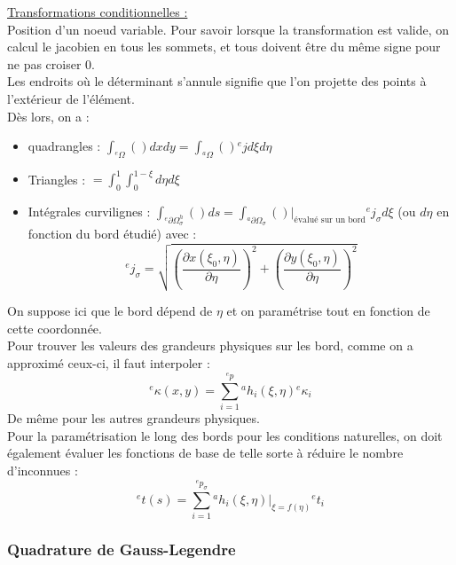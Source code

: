 \documentclass[../main.tex]{subfiles}
\begin{document}
\quad \underline{Transformations conditionnelles :}\\
Position d'un noeud variable. Pour savoir lorsque la transformation est valide, on calcul le jacobien en tous les sommets, et tous doivent être du même signe pour ne pas croiser 0.\\

Les endroits où le déterminant s'annule signifie que l'on projette des points à l'extérieur de l'élément.\\ 

Dès lors, on a : \begin{itemize}
    \item quadrangles : $\int_{{}^e\Omega} ()dxdy = \int_{{}^a\Omega} () {}^ejd\xi d\eta$\\
    \item Triangles : $ = \int_{0}^1\int_0^{1-\xi}d\eta d\xi$\\
    \item Intégrales curvilignes : $\int_{{}^e\partial \Omega_\sigma^h}()ds = \int_{{}^a\partial \Omega_\sigma}()\lvert_{\text{évalué sur un bord}} {}^ej_\sigma d\xi$ (ou $d\eta$ en fonction du bord étudié) avec : \begin{equation}
{}^ej_\sigma = \sqrt{(\frac{\partial x(\xi_0, \eta)}{\partial \eta})^2 + (\frac{\partial y(\xi_0, \eta)}{\partial \eta})^2}
\end{equation}
\end{itemize}


\warning On suppose ici que le bord dépend de $\eta$ et on paramétrise tout en fonction de cette coordonnée.\\

Pour trouver les valeurs des grandeurs physiques sur les bord, comme on a approximé ceux-ci, il faut interpoler : \begin{equation}
    {}^e\kappa(x,y) = \sum_{i=1}^{{}^ep}{}^ah_i(\xi, \eta) {}^e\kappa_i
\end{equation}
De même pour les autres grandeurs physiques.\\
Pour la paramétrisation le long des bords pour les conditions naturelles, on doit également évaluer les fonctions de base de telle sorte à réduire le nombre d'inconnues : \begin{equation}
    {}^et(s) = \sum_{i=1}^{{}^ep_\sigma} {}^ah_i(\xi, \eta)\lvert_{\xi = f(\eta)} {}^et_i
\end{equation}

\subsubsection{Quadrature de Gauss-Legendre}
\end{document}
